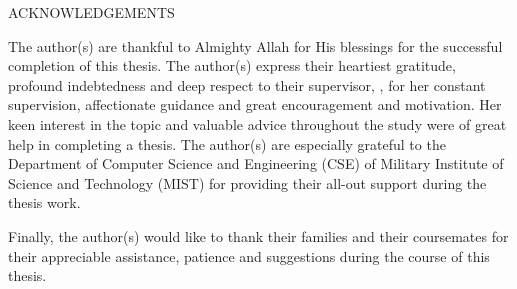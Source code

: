 \vspace{25mm}
\begin{center} 
    \Large ACKNOWLEDGEMENTS\\
\end{center} 

\vspace{18mm}
\justifying
The author(s) are thankful to Almighty Allah for His blessings for the successful
completion of this thesis. The author(s) express their heartiest gratitude, profound indebtedness and deep respect to their supervisor, {\def\supdel{, }\supervisor}, for her constant supervision, affectionate guidance and great encouragement and motivation. Her keen interest in the topic and valuable advice throughout the study were of great help in completing a thesis. The author(s) are especially grateful to the Department of Computer Science and
Engineering (CSE) of Military Institute of Science and Technology (MIST) for providing their all-out support during the thesis work.



Finally,  the author(s) would like to thank their families and their coursemates for
their appreciable assistance, patience and suggestions during the
course of this thesis.

